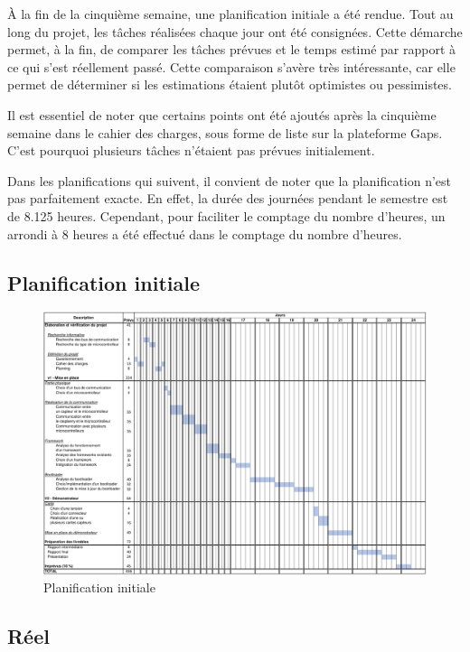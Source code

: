 À la fin de la cinquième semaine, une planification initiale a été rendue.
Tout au long du projet, les tâches réalisées chaque jour ont été consignées. Cette démarche permet, à la fin, de comparer les tâches prévues et le temps estimé par rapport à ce qui s'est réellement passé.
Cette comparaison s'avère très intéressante, car elle permet de déterminer si les estimations étaient plutôt optimistes ou pessimistes.

Il est essentiel de noter que certains points ont été ajoutés après la cinquième semaine dans le cahier des charges, sous forme de liste sur la plateforme Gaps.
C'est pourquoi plusieurs tâches n'étaient pas prévues initialement.

Dans les planifications qui suivent, il convient de noter que la planification n'est pas parfaitement exacte.
En effet, la durée des journées pendant le semestre est de 8.125 heures.
Cependant, pour faciliter le comptage du nombre d'heures, un arrondi à 8 heures a été effectué dans le comptage du nombre d'heures.

\newpage
\subsection{Planification initiale}

\begin{figure}[H]
    \centering
    \includegraphics[angle=90,origin=c,scale=0.55]{./assets/files/planning_initial.pdf}
    \caption{Planification initiale}
\end{figure}

\newpage
\subsection{Réel}

